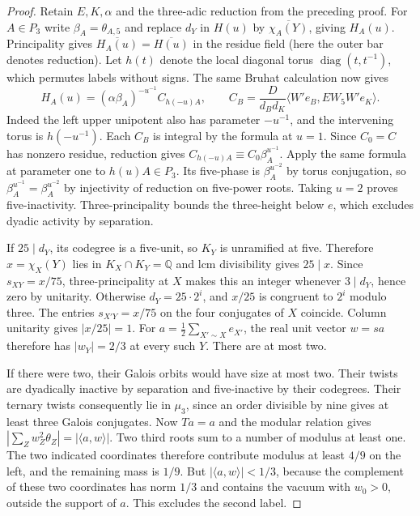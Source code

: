 \documentclass[11pt,a4paper]{article}
\numberwithin{equation}{section}
\theoremstyle{remark}
\newcommand{\QQ}{\mathbb Q}
\begin{document}
\begin{proof}
Retain $E,K,\alpha$ and the three-adic reduction from the preceding
proof. For $A\in P_3$ write $\beta_A=\theta_{A,5}$ and replace $d_Y$
in $H(u)$ by $\overline{\chi_A(Y)}$, giving $H_A(u)$. Principality
gives $\overline{H_A(u)}=\overline{H(u)}$ in the residue field
(here the outer bar denotes reduction). Let $h(t)$ denote the local
diagonal torus $\operatorname{diag}(t,t^{-1})$, which permutes labels
without signs. The same Bruhat calculation now gives
\[
 H_A(u)=(\alpha\beta_A)^{-u^{-1}} C_{h(-u)A},\qquad
 C_B=\frac{D}{d_Bd_K}\langle W'e_B,E W_5 W'e_K\rangle .
\]
Indeed the left upper unipotent also has parameter $-u^{-1}$, and the
intervening torus is $h(-u^{-1})$. Each $C_B$ is integral by the
formula at $u=1$. Since $C_0=C$ has nonzero residue, reduction gives
$C_{h(-u)A}\equiv C_0\beta_A^{u^{-1}}$. Apply the same formula
at parameter one to $h(u)A\in P_3$. Its five-phase is
$\beta_A^{u^{-2}}$ by torus conjugation, so
$\beta_A^{u^{-1}}=\beta_A^{u^{-2}}$ by injectivity of reduction on
five-power roots. Taking $u=2$ proves five-inactivity. Three-principality
bounds the three-height below $e$, which excludes dyadic activity by
separation.

If $25\mid d_Y$, its codegree is a five-unit, so $K_Y$ is unramified
at five. Therefore $x=\chi_X(Y)$ lies in $K_X\cap K_Y=\QQ$ and lcm
divisibility gives $25\mid x$. Since $s_{XY}=x/75$, three-principality
at $X$ makes this an integer whenever $3\mid d_Y$, hence zero by
unitarity. Otherwise $d_Y=25\cdot2^i$, and $x/25$ is congruent
to $2^i$ modulo three. The entries $s_{X'Y}=x/75$ on the four
conjugates of $X$ coincide. Column unitarity gives $|x/25|=1$.
For $a=\tfrac12\sum_{X'\sim X}e_{X'}$, the real unit vector $w=sa$
therefore has $|w_Y|=2/3$ at every such $Y$. There are at most two.

If there were two, their Galois orbits would have size at most two.
Their twists are dyadically inactive by separation and five-inactive by
their codegrees. Their ternary twists consequently lie in $\mu_3$,
since an order divisible by nine gives at least three Galois
conjugates. Now $Ta=a$ and the modular relation gives
$|\sum_Zw_Z^2\theta_Z|=|\langle a,w\rangle|$. Two third roots sum
to a number of modulus at least one. The two indicated coordinates
therefore contribute modulus at least $4/9$ on the left, and the
remaining mass is $1/9$. But $|\langle a,w\rangle|<1/3$, because
the complement of these two coordinates has norm $1/3$ and contains
the vacuum with $w_0>0$, outside the support of $a$. This excludes
the second label.
\end{proof}
\end{document}
